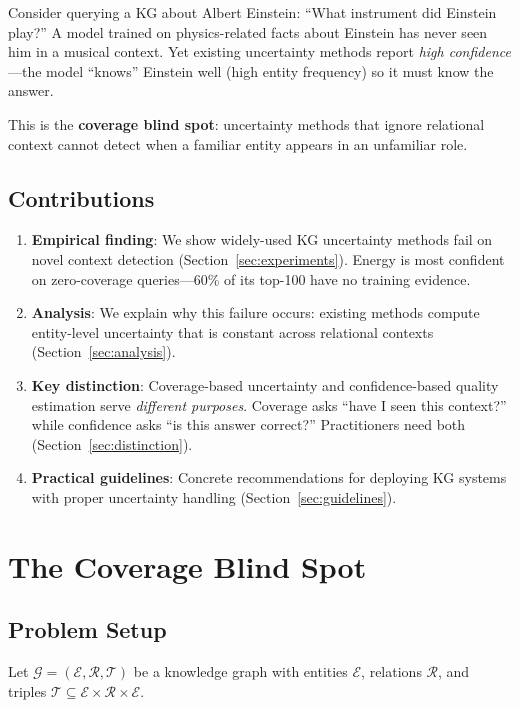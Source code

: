\documentclass{article}
\begin{document}
Consider querying a KG about Albert Einstein: ``What instrument did Einstein play?'' A model trained on physics-related facts about Einstein has never seen him in a musical context. Yet existing uncertainty methods report \emph{high confidence}---the model ``knows'' Einstein well (high entity frequency) so it must know the answer.

This is the \textbf{coverage blind spot}: uncertainty methods that ignore relational context cannot detect when a familiar entity appears in an unfamiliar role.

\subsection{Contributions}

\begin{enumerate}
    \item \textbf{Empirical finding}: We show widely-used KG uncertainty methods fail on novel context detection (Section~\ref{sec:experiments}). Energy is most confident on zero-coverage queries---60\% of its top-100 have no training evidence.

    \item \textbf{Analysis}: We explain why this failure occurs: existing methods compute entity-level uncertainty that is constant across relational contexts (Section~\ref{sec:analysis}).

    \item \textbf{Key distinction}: Coverage-based uncertainty and confidence-based quality estimation serve \emph{different purposes}. Coverage asks ``have I seen this context?'' while confidence asks ``is this answer correct?'' Practitioners need both (Section~\ref{sec:distinction}).

    \item \textbf{Practical guidelines}: Concrete recommendations for deploying KG systems with proper uncertainty handling (Section~\ref{sec:guidelines}).
\end{enumerate}

\section{The Coverage Blind Spot}

\subsection{Problem Setup}

Let $\mathcal{G} = (\mathcal{E}, \mathcal{R}, \mathcal{T})$ be a knowledge graph with entities $\mathcal{E}$, relations $\mathcal{R}$, and triples $\mathcal{T} \subseteq \mathcal{E} \times \mathcal{R} \times \mathcal{E}$.
\end{document}
